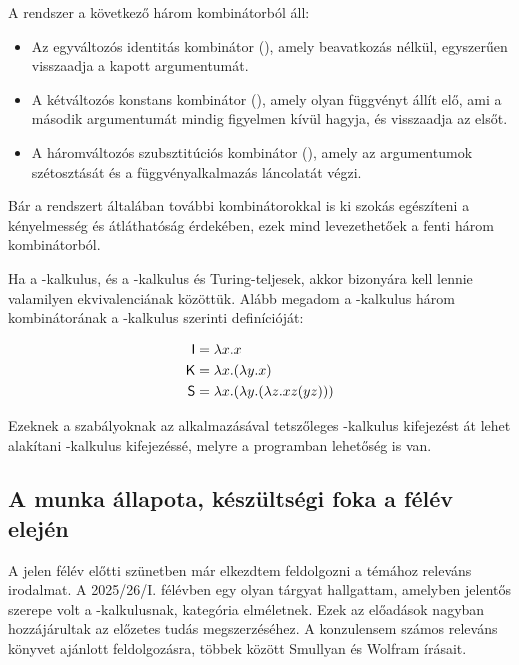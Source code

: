 \documentclass[a4paper,oneside]{article}
\begin{document}
A rendszer a következő három kombinátorból áll:
\begin{itemize}
  \item Az egyváltozós identitás kombinátor (\Icomb), amely beavatkozás nélkül, egyszerűen visszaadja a kapott argumentumát.
  \item A kétváltozós konstans kombinátor (\Kcomb), amely olyan függvényt állít elő, ami a második argumentumát mindig figyelmen kívül hagyja, és visszaadja az elsőt.
  \item A háromváltozós szubsztitúciós kombinátor (\Scomb), amely az argumentumok szétosztását és a függvényalkalmazás láncolatát végzi.
\end{itemize}

Bár a rendszert általában további kombinátorokkal is ki szokás egészíteni a kényelmesség és átláthatóság érdekében, ezek mind levezethetőek a fenti három kombinátorból.

Ha a \lam-kalkulus, és a \ski-kalkulus és Turing-teljesek, akkor bizonyára kell lennie valamilyen ekvivalenciának közöttük. Alább megadom a \ski-kalkulus három kombinátorának a \lam-kalkulus szerinti definícióját:

\[
  \begin{aligned}
    \textsf{I} & = \lambda x.x                              \\
    \textsf{K} & = \lambda x.(\lambda y.x)                  \\
    \textsf{S} & = \lambda x.(\lambda y.(\lambda z.xz(yz)))
  \end{aligned}
\]

Ezeknek a szabályoknak az alkalmazásával tetszőleges \ski-kalkulus kifejezést át lehet alakítani \lam-kalkulus kifejezéssé, melyre a programban lehetőség is van.

\subsection{A munka állapota, készültségi foka a félév elején}
\label{sec:munka-allap-kesz}

A jelen félév előtti szünetben már elkezdtem feldolgozni a témához releváns irodalmat. A 2025/26/I. félévben egy olyan tárgyat hallgattam, amelyben jelentős szerepe volt a \lam-kalkulusnak, kategória elméletnek. Ezek az előadások nagyban hozzájárultak az előzetes tudás megszerzéséhez. A konzulensem számos releváns könyvet ajánlott feldolgozásra, többek között Smullyan \cite{smullyanMockMockingbirdOther2000} és Wolfram \cite{wolframCombinatorsCentennialView2020, wolframCombinatorsStoryComputation2020} írásait.
\end{document}
